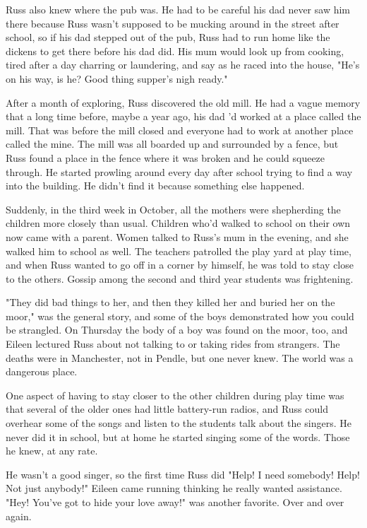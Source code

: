 Russ also knew where the pub was. He had to be careful his dad never saw him there because Russ wasn't supposed to be mucking around in the street after school, so if his dad stepped out of the pub, Russ had to run home like the dickens to get there before his dad did. His mum would look up from cooking, tired after a day charring or laundering, and say as he raced into the house, "He's on his way, is he? Good thing supper's nigh ready."

After a month of exploring, Russ discovered the old mill. He had a vague memory that a long time before, maybe a year ago, his dad 'd worked at a place called the mill. That was before the mill closed and everyone had to work at another place called the mine. The mill was all boarded up and surrounded by a fence, but Russ found a place in the fence where it was broken and he could squeeze through. He started prowling around every day after school trying to find a way into the building. He didn't find it because something else happened.

Suddenly, in the third week in October, all the mothers were shepherding the children more closely than usual. Children who'd walked to school on their own now came with a parent. Women talked to Russ's mum in the evening, and she walked him to school as well. The teachers patrolled the play yard at play time, and when Russ wanted to go off in a corner by himself, he was told to stay close to the others. Gossip among the second and third year students was frightening.

"They did bad things to her, and then they killed her and buried her on the moor," was the general story, and some of the boys demonstrated how you could be strangled. On Thursday the body of a boy was found on the moor, too, and Eileen lectured Russ about not talking to or taking rides from strangers. The deaths were in Manchester, not in Pendle, but one never knew. The world was a dangerous place.

One aspect of having to stay closer to the other children during play time was that several of the older ones had little battery-run radios, and Russ could overhear some of the songs and listen to the students talk about the singers. He never did it in school, but at home he started singing some of the words. Those he knew, at any rate.

He wasn't a good singer, so the first time Russ did "Help! I need somebody! Help! Not just anybody!" Eileen came running thinking he really wanted assistance. "Hey! You've got to hide your love away!" was another favorite. Over and over again.

